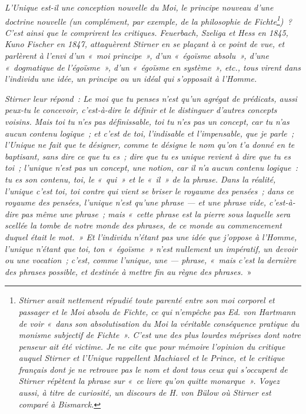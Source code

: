 \documentclass[french,twoside]{book} %
\begin{document}
\emph{L’Unique est-il une conception nouvelle du Moi, le principe nouveau d’une doctrine nouvelle (un complément, par exemple, de la philosophie de Fichte\footnote{ \noindent \emph{Stirner avait nettement répudié toute parenté entre son moi corporel et passager et le Moi absolu de Fichte, ce qui n'empêche pas Ed. von Hartmann de voir « dans son \emph{absolutisation} du Moi la véritable conséquence pratique du monisme subjectif de Fichte ». C'est une des plus lourdes méprises dont notre penseur ait été victime. Je ne cite que pour mémoire l'opinion du critique auquel Stirner et l'Unique rappellent Machiavel et le Prince, et le critique français dont je ne retrouve pas le nom et dont tous ceux qui s'occupent de Stirner répètent la phrase sur « ce livre qu'on quitte monarque ». Voyez aussi, à titre de curiosité, un discours de H. von Bülow où Stirner est comparé à Bismarck.}
 }) ? C’est ainsi que le comprirent les critiques. Feuerbach, Szeliga et Hess en 1845, Kuno Fischer en 1847, attaquèrent Stirner en se plaçant à ce point de vue, et parlèrent à l’envi d’un « moi principe », d’un « égoïsme absolu », d’une « dogmatique de l’égoïsme », d’un « égoïsme en système », etc., tous virent dans l’individu une idée, un principe ou un idéal qui s’opposait à l’Homme.}\par
\emph{Stirner leur répond : Le moi que tu penses n’est  qu’un agrégat de prédicats, aussi peux-tu le concevoir, c’est-à-dire le définir et le distinguer d’autres concepts voisins. Mais \emph{toi} tu n’es pas définissable, \emph{toi} tu n’es pas un concept, car tu n’as aucun contenu logique ; et c’est de toi, l’indisable et l’impensable, que je parle ; l’Unique ne fait que te désigner, comme te désigne le nom qu’on t’a donné en te baptisant, sans dire ce que tu es ; dire que tu es unique revient à dire que tu es toi ; l’unique n’est pas un concept, une notion, car il n’a aucun contenu logique : tu es son contenu, toi, le « qui » et le « il » de la phrase. Dans la réalité, l’unique c’est toi, toi contre qui vient se briser le royaume des pensées ; dans ce royaume des pensées, l’unique n’est qu’une phrase — et une phrase vide, c’est-à-dire pas même une phrase ; mais « cette phrase est la pierre sous laquelle sera scellée la tombe de notre monde des phrases, de ce monde au commencement duquel était le mot. » Et l’individu n’étant pas une idée que j’oppose à l’Homme, l’unique n’étant que toi, ton « égoïsme » n’est nullement un impératif, un devoir ou une vocation ; c’est, comme l’unique, une — phrase, « mais c’est la dernière des phrases possible, et destinée à mettre fin au règne des phrases.} »\par
\end{document}
